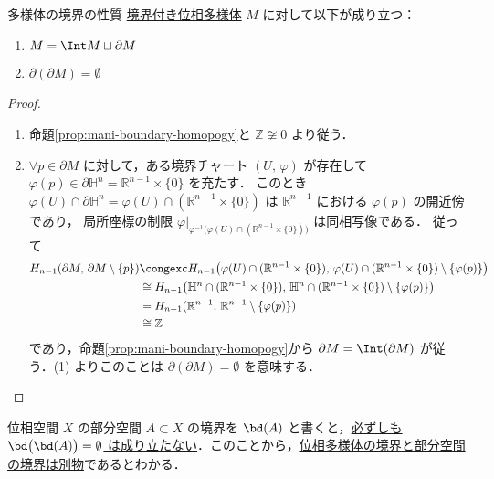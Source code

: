 \documentclass[algtopo_main]{subfiles}
\begin{document}
\begin{mycol}[]{多様体の境界の性質}
	\hyperref[def:mani-with-boundary]{境界付き位相多様体} $M$ に対して以下が成り立つ：
	\begin{enumerate}
        \item $M = \Int M \sqcup \partial M$
        \item $\partial (\partial M) = \emptyset$
    \end{enumerate}
\end{mycol}

\begin{proof}
    \begin{enumerate}
        \item 命題\ref{prop:mani-boundary-homopogy}と $\mathbb{Z} \not\cong 0$ より従う．
        \item $\forall p \in \partial M$ に対して，ある境界チャート $(U,\, \varphi)$ が存在して $\varphi(p) \in \partial \mathbb{H}^n = \mathbb{R}^{n-1} \times \{0\}$ を充たす．
        このとき $\varphi(U) \cap \partial \mathbb{H}^n = \varphi(U) \cap (\mathbb{R}^{n-1} \times \{0\})$ は $\mathbb{R}^{n-1}$ における $\varphi (p)$ の開近傍であり，
        局所座標の制限 $\varphi|_{\varphi^{-1}\bigl( \varphi(U) \cap  (\mathbb{R}^{n-1} \times \{0\})\bigr)}$ は同相写像である．
        従って
        \begin{align}
            H_{n-1}(\partial M,\, \partial M \setminus \{p\}) &\congexc H_{n-1} \bigl( \varphi(U) \cap  (\mathbb{R}^{n-1} \times \{0\}),\, \varphi(U) \cap  (\mathbb{R}^{n-1} \times \{0\}) \setminus \{\varphi(p)\}  \bigr) \\ 
            &\cong H_{n-1} \bigl( \mathbb{H}^n \cap  (\mathbb{R}^{n-1} \times \{0\}),\, \mathbb{H}^n \cap  (\mathbb{R}^{n-1} \times \{0\}) \setminus \{\varphi(p)\}  \bigr) \\ 
            &= H_{n-1} (\mathbb{R}^{n-1},\, \mathbb{R}^{n-1} \setminus \{\varphi(p)\}) \\
            &\cong \mathbb{Z}
        \end{align}
        であり，命題\ref{prop:mani-boundary-homopogy}から $\partial M = \Int (\partial M)$ が従う．(1) よりこのことは $\partial(\partial M) =\emptyset$ を意味する．
    \end{enumerate}
\end{proof}

\begin{marker}
    位相空間 $X$ の部分空間 $A \subset X$ の境界を $\bd(A)$ と書くと，\underline{必ずしも $\bd \bigl(\bd (A)\bigr) = \emptyset$ は成り立たない}．このことから，\underline{\hyperref[def:int-manifold-with-boundary]{位相多様体の境界}と部分空間の境界は別物}であるとわかる．
\end{marker}
\end{document}
